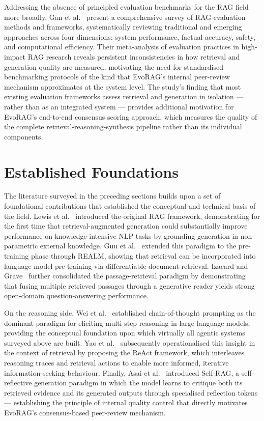 Addressing the absence of principled evaluation benchmarks for the RAG field more
broadly, Gan et al.~\cite{gan2025rageval} present a comprehensive survey of RAG
evaluation methods and frameworks, systematically reviewing traditional and emerging
approaches across four dimensions: system performance, factual accuracy, safety, and
computational efficiency.
Their meta-analysis of evaluation practices in high-impact RAG research reveals
persistent inconsistencies in how retrieval and generation quality are measured,
motivating the need for standardised benchmarking protocols of the kind that EvoRAG's
internal peer-review mechanism approximates at the system level.
The study's finding that most existing evaluation frameworks assess retrieval and
generation in isolation — rather than as an integrated system — provides additional
motivation for EvoRAG's end-to-end consensus scoring approach, which measures the
quality of the complete retrieval-reasoning-synthesis pipeline rather than its
individual components.

\section{Established Foundations}
 
The literature surveyed in the preceding sections builds upon a set of foundational
contributions that established the conceptual and technical basis of the field.
Lewis et al.~\cite{lewis2020rag} introduced the original RAG framework, demonstrating
for the first time that retrieval-augmented generation could substantially improve
performance on knowledge-intensive NLP tasks by grounding generation in non-parametric
external knowledge.
Guu et al.~\cite{guu2020realm} extended this paradigm to the pre-training phase through
REALM, showing that retrieval can be incorporated into language model pre-training
via differentiable document retrieval.
Izacard and Grave~\cite{izacard2021passage} further consolidated the passage-retrieval
paradigm by demonstrating that fusing multiple retrieved passages through a generative
reader yields strong open-domain question-answering performance.
 
On the reasoning side, Wei et al.~\cite{wei2022cot} established chain-of-thought
prompting as the dominant paradigm for eliciting multi-step reasoning in large language
models, providing the conceptual foundation upon which virtually all agentic systems
surveyed above are built.
Yao et al.~\cite{yao2022react} subsequently operationalised this insight in the context
of retrieval by proposing the ReAct framework, which interleaves reasoning traces and
retrieval actions to enable more informed, iterative information-seeking behaviour.
Finally, Asai et al.~\cite{asai2023selfrag} introduced Self-RAG, a self-reflective
generation paradigm in which the model learns to critique both its retrieved evidence
and its generated outputs through specialised reflection tokens — establishing the
principle of internal quality control that directly motivates EvoRAG's consensus-based
peer-review mechanism.
 
